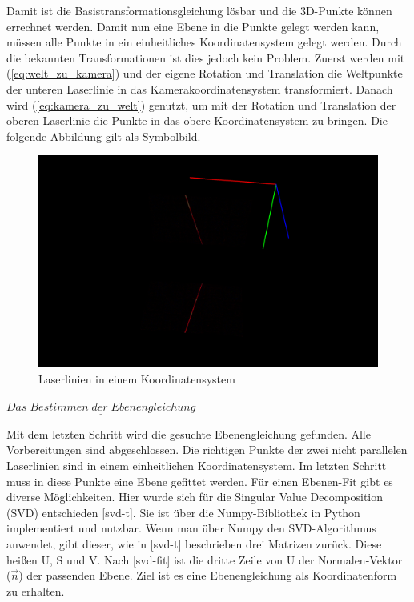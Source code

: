 		Damit ist die Basistransformationsgleichung lösbar und die 3D-Punkte können errechnet werden. Damit nun eine Ebene in die Punkte gelegt werden kann, müssen alle Punkte in ein einheitliches Koordinatensystem gelegt werden. Durch die bekannten Transformationen ist dies jedoch kein Problem. Zuerst werden mit (\ref{eq:welt_zu_kamera}) und der eigene Rotation und Translation die Weltpunkte der unteren Laserlinie in das Kamerakoordinatensystem transformiert. Danach wird (\ref{eq:kamera_zu_welt}) genutzt, um mit der Rotation und Translation der oberen Laserlinie die Punkte in das obere Koordinatensystem zu bringen. Die folgende Abbildung gilt als Symbolbild.
	
		\begin{figure}[h]
			\centering
			\includegraphics[width=0.85\linewidth]{img/hauptteil/ext-calib/laserline_together.png}
			\caption{Laserlinien in einem Koordinatensystem}
			\label{fig:ext-calib-laserlines-together}
		\end{figure}
	
		$\underline{Das \; Bestimmen \; der \; Ebenengleichung}$
		
		Mit dem letzten Schritt wird die gesuchte Ebenengleichung gefunden. Alle Vorbereitungen sind abgeschlossen. Die richtigen Punkte der zwei nicht parallelen Laserlinien sind in einem einheitlichen Koordinatensystem. Im letzten Schritt muss in diese Punkte eine Ebene gefittet werden. Für einen Ebenen-Fit gibt es diverse Möglichkeiten. Hier wurde sich für die Singular Value Decomposition (SVD) entschieden [svd-t]. Sie ist über die Numpy-Bibliothek in Python implementiert und nutzbar. Wenn man über Numpy den SVD-Algorithmus anwendet, gibt dieser, wie in [svd-t] beschrieben drei Matrizen zurück. Diese heißen U, S und V. Nach [svd-fit] ist die dritte Zeile von U der Normalen-Vektor (\( \vec{n} \)) der passenden Ebene. Ziel ist es eine Ebenengleichung als Koordinatenform zu erhalten. 
		
